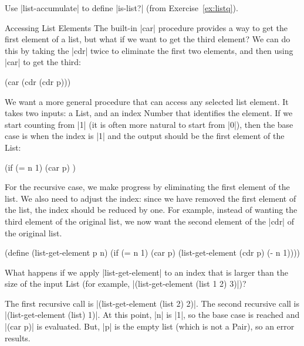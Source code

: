 \begin{schemeregion}
\beforeex
\begin{exercise}
\goldstar Use \scheme|list-accumulate| to define \scheme|is-list?| (from Exercise~\ref{ex:listq}).
\solution{\LATER{}}
\end{exercise}
\afterex

\begin{examplenobar}{Accessing List Elements}\label{example:list-get-element}
The built-in \scheme|car| procedure provides a way to get the first element of a list, but what if we want to get the third element?  We can do this by taking the \scheme|cdr| twice to eliminate the first two elements, and then using \scheme|car| to get the third: 
\begin{schemedisplay}
(car (cdr (cdr p)))
\end{schemedisplay}

We want a more general procedure that can access any selected list element.  It takes two inputs: a List, and an index Number that identifies the element.  If we start counting from \scheme|1| (it is often more natural to start from \scheme|0|), then the base case is when the index is \scheme|1| and the output should be the first element of the List: 
\begin{schemedisplay}
(if (= n 1) (car p) \rest)
\end{schemedisplay}

For the recursive case, we make progress by eliminating the first element of the list.  We also need to adjust the index: since we have removed the first element of the list, the index should be reduced by one.  For example, instead of wanting the third element of the original list, we now want the second element of the \scheme|cdr| of the original list.

\begin{schemedisplay}
(define (list-get-element p n) 
   (if (= n 1)
       (car p)
       (list-get-element (cdr p) (- n 1))))
\end{schemedisplay}

What happens if we apply \scheme|list-get-element| to an index that is larger than the size of the input List (for example, \scheme|(list-get-element (list 1 2) 3)|)?

The first recursive call is \scheme|(list-get-element (list 2) 2)|.  The second recursive call is \scheme|(list-get-element (list) 1)|.  At this point, \scheme|n| is \scheme|1|, so the base case is reached and \scheme|(car p)| is evaluated.  But, \scheme|p| is the empty list (which is not a Pair), so an error results.


\end{examplenobar}
\end{schemeregion}
